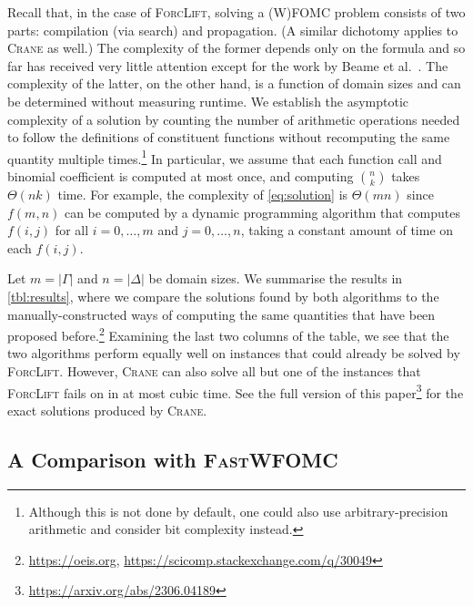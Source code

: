 \documentclass{article}
\begin{document}

Recall that, in the case of \textsc{ForcLift}, solving a (W)FOMC problem
consists of two parts: compilation (via search) and propagation. (A similar
dichotomy applies to \textsc{Crane} as well.) The complexity of the former
depends only on the formula and so far has received very little attention except
for the work by Beame et al.~. The
complexity of the latter, on the other hand, is a function of domain sizes and
can be determined without measuring runtime. We establish the asymptotic
complexity of a solution by counting the number of arithmetic operations needed
to follow the definitions of constituent functions without recomputing the same
quantity multiple times.\footnote{Although this is not done by default, one
  could also use arbitrary-precision arithmetic and consider bit complexity
  instead.} In particular, we assume that each function call and binomial
coefficient is computed at most once, and computing $\binom{n}{k}$ takes
$\Theta(nk)$ time. For example, the complexity of \cref{eq:solution} is
$\Theta(mn)$ since $f(m, n)$ can be computed by a dynamic programming algorithm
that computes $f(i, j)$ for all $i = 0, \dots, m$ and $j = 0, \dots, n$, taking
a constant amount of time on each $f(i, j)$.

Let $m = |\Gamma|$ and $n = |\Delta|$ be domain sizes. We summarise the results
in \cref{tbl:results}, where we compare the solutions found by both algorithms
to the manually-constructed ways of computing the same quantities that have been
proposed before.\footnote{\url{https://oeis.org},
  \url{https://scicomp.stackexchange.com/q/30049}} Examining the last two
columns of the table, we see that the two algorithms perform equally well on
instances that could already be solved by \textsc{ForcLift}. However,
\textsc{Crane} can also solve all but one of the instances that
\textsc{ForcLift} fails on in at most cubic time. See the full version of this
paper\footnote{\url{https://arxiv.org/abs/2306.04189}} for the exact solutions
produced by \textsc{Crane}.

\subsection{A Comparison with \textsc{\normalfont FastWFOMC}}
\end{document}
